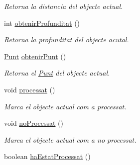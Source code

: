 \begin{DoxyCompactItemize}
\begin{DoxyCompactList}\small\item\em Retorna la distancia del objecte actual. \end{DoxyCompactList}\item 
\hypertarget{classlogica_1_1algoritmica_1_1_casella_a7508a35b8d809c1ec0dcf9d37cc4cdcf}{int \hyperlink{classlogica_1_1algoritmica_1_1_casella_a7508a35b8d809c1ec0dcf9d37cc4cdcf}{obtenir\+Profunditat} ()}\label{classlogica_1_1algoritmica_1_1_casella_a7508a35b8d809c1ec0dcf9d37cc4cdcf}

\begin{DoxyCompactList}\small\item\em Retorna la profunditat del objecte acutal. \end{DoxyCompactList}\item 
\hypertarget{classlogica_1_1algoritmica_1_1_casella_afdf32ce73b821ce361044ed83a3b4003}{\hyperlink{classlogica_1_1_punt}{Punt} \hyperlink{classlogica_1_1algoritmica_1_1_casella_afdf32ce73b821ce361044ed83a3b4003}{obtenir\+Punt} ()}\label{classlogica_1_1algoritmica_1_1_casella_afdf32ce73b821ce361044ed83a3b4003}

\begin{DoxyCompactList}\small\item\em Retorna el \hyperlink{classlogica_1_1_punt}{Punt} del objecte actual. \end{DoxyCompactList}\item 
void \hyperlink{classlogica_1_1algoritmica_1_1_casella_aacd54c7a5a4c243769f7b4648f9bfd6d}{processat} ()
\begin{DoxyCompactList}\small\item\em Marca el objecte actual com a processat. \end{DoxyCompactList}\item 
void \hyperlink{classlogica_1_1algoritmica_1_1_casella_a081ffe85bdbe5d97b330c40d2881a74f}{no\+Processat} ()
\begin{DoxyCompactList}\small\item\em Marca el objecte actual com a no processat. \end{DoxyCompactList}\item 
\hypertarget{classlogica_1_1algoritmica_1_1_casella_a79b54543059fa328c5d18a96d694cf54}{boolean \hyperlink{classlogica_1_1algoritmica_1_1_casella_a79b54543059fa328c5d18a96d694cf54}{ha\+Estat\+Processat} ()}\label{classlogica_1_1algoritmica_1_1_casella_a79b54543059fa328c5d18a96d694cf54}


\end{DoxyCompactItemize}
